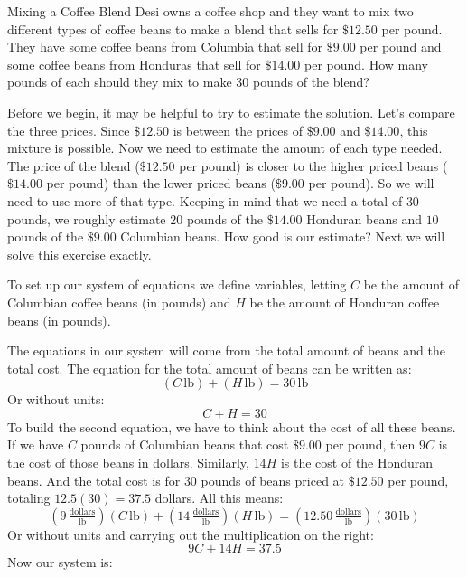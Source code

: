 \documentclass[nooutcomes]{ximera}
\begin{document}
\begin{example}{Mixing a Coffee Blend}
          Desi owns a coffee shop and they want to mix two different types of coffee beans to make a blend that sells for $\$12.50$ per pound.
          They have some coffee beans from Columbia that sell for $\$9.00$ per pound and some coffee beans from Honduras that sell for $\$14.00$ per pound.
          How many pounds of each should they mix to make $30$ pounds of the blend?
\begin{explanation}
          Before we begin, it may be helpful to try to estimate the solution.
          Let's compare the three prices.
          Since $\$12.50$ is between the prices of $\$9.00$ and $\$14.00$,
          this mixture is possible.
          Now we need to estimate the amount of each type needed.
          The price of the blend ($\$12.50$ per pound) is closer to the higher priced beans ($\$14.00$ per pound) than the lower priced beans
          ($\$9.00$ per pound).
          So we will need to use more of that type.
          Keeping in mind that we need a total of $30$ pounds,
          we roughly estimate $20$ pounds of the $\$14.00$ Honduran beans and $10$ pounds of the $\$9.00$ Columbian beans.
          How good is our estimate?
          Next we will solve this exercise exactly.

          To set up our system of equations we define variables,
          letting $C$ be the amount of Columbian coffee beans
          (in pounds)
          and $H$ be the amount of Honduran coffee beans
          (in pounds).

          The equations in our system will come from the total amount of beans and the total cost.
          The equation for the total amount of beans can be written as:
      $$    
            (C\,\text{lb})+(H\,\text{lb})=30\,\text{lb}
   $$     
          Or without units:
         $$
            C+H=30
$$
          To build the second equation,
          we have to think about the cost of all these beans.
          If we have $C$ pounds of Columbian beans that cost $\$9.00$ per pound,
          then $9C$ is the cost of those beans in dollars.
          Similarly, $14H$ is the cost of the Honduran beans.
          And the total cost is for $30$ pounds of beans priced at $\$12.50$ per pound,
          totaling $12.5(30)=37.5$ dollars.
          All this means:
    $$      
            \left(9\,\tfrac{\text{dollars}}{\text{lb}}\right)(C\,\text{lb})+\left(14\,\tfrac{\text{dollars}}{\text{lb}}\right)(H\,\text{lb})=\left(12.50\,\tfrac{\text{dollars}}{\text{lb}}\right)(30\,\text{lb})
 $$
          Or without units and carrying out the multiplication on the right:
     $$
            9C+14H=37.5
$$
          Now our system is:


\end{explanation}
\end{example}
\end{document}
